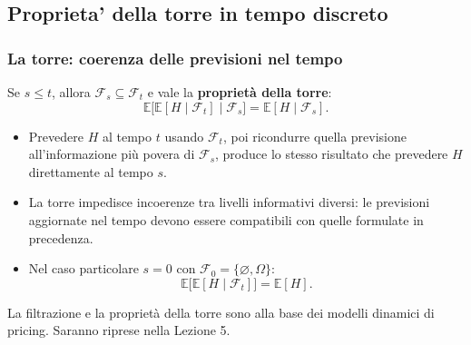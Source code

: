 \documentclass[handout]{beamer}%
\newenvironment{stepitemize}{\begin{itemize}[<+->]}{\end{itemize} }
\providecommand{\E}{\mathbb{E}}
\providecommand{\1}{\mathbf{1}}
\providecommand{\QTR}[2]{\csname #1\endcsname{#2}}
\begin{document}
\subsection{Proprieta' della torre in tempo discreto}%

\begin{frame}%

\frametitle{La torre: coerenza delle previsioni nel tempo}%
%

%


Se $s \leq t$, allora $\mathcal{F}_{s} \subseteq\mathcal{F}_{t}$ e vale la
\textbf{propriet\`{a} della torre}:
\[
\E\bigl[\E[H\mid\mathcal{F}_t]\mid\mathcal{F}_{s}\bigr] =
\E[H\mid\mathcal{F}_s].
\]


\begin{stepitemize}
\item Prevedere $H$ al tempo $t$ usando $\mathcal{F}_{t}$, poi ricondurre
quella previsione all'informazione pi\`{u} povera di $\mathcal{F}_{s}$,
produce lo stesso risultato che prevedere $H$ direttamente al tempo $s$.

\item La torre impedisce incoerenze tra livelli informativi diversi: le
previsioni aggiornate nel tempo devono essere compatibili con quelle formulate
in precedenza.

\item Nel caso particolare $s=0$ con $\mathcal{F}_{0} = \{\varnothing
,\Omega\}$:
\[
\E\bigl[\E[H\mid\mathcal{F}_t]\bigr] = \E[H].
\]

\end{stepitemize}

\medskip

\begin{center}
{\small La filtrazione e la propriet\`{a} della torre sono alla base dei
modelli dinamici di pricing. Saranno riprese nella Lezione 5.}
\end{center}%

\transboxout
\end{frame}%
\end{document}
